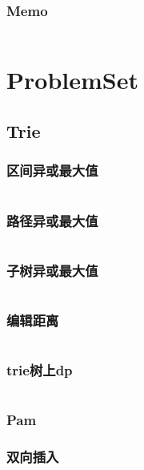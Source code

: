 \documentclass[a4paper,12pt]{article}
\begin{document}
\subsubsection{Memo}
\inputminted[]{c++}{Template/String/usage/sam-1.cpp}
\section{ProblemSet}
\subsection{Trie}
\subsubsection{区间异或最大值}
\inputminted[]{c++}{code/bzoj3261.cpp}
\subsubsection{路径异或最大值}
\inputminted[]{c++}{code/hdu4757.cpp}
\subsubsection{子树异或最大值}
\inputminted[]{c++}{code/hdu6191.cpp}
\subsubsection{编辑距离}
\inputminted[]{c++}{code/bzoj1819.cpp}
\subsubsection{trie树上dp}
\inputminted[]{c++}{code/UVALive3942.cpp}
\subsubsection{Pam}
\subsubsection{双向插入}
\inputminted[]{c++}{code/hdu5421.cpp}
\end{document}

